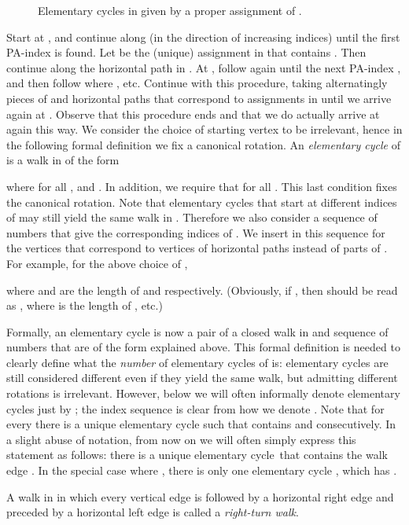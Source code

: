 \documentclass{llncs}
\def\term#1{{\em #1}\marginpar{\raggedright{\small\it #1}}}
\newcommand{\elcyc}{elementary cycle}
\begin{document}
\begin{figure}
\centering
\scalebox{0.75}{WAW,A}
\caption{Elementary cycles in  given by a proper assignment  of .}
\label{fig:elcycs}
\end{figure} 
 
 
Start at , and continue along  (in the direction of increasing indices) until the first PA-index  is found. Let  be the (unique) assignment in  that contains . Then continue along the horizontal path  in . At , follow  again until the next PA-index , and then follow  where , etc. Continue with this procedure, taking alternatingly pieces of  and horizontal paths that correspond to assignments in  until we arrive again at . 
Observe that this procedure ends and that we do actually arrive at  again this way. We consider the choice of starting vertex to be irrelevant, hence in the following formal definition we fix a canonical rotation.
An \term{elementary cycle} of  is a walk in  of the form

where  for all , and . In addition, we require that  for all . This last condition fixes the canonical rotation. 
Note that elementary cycles that start at different indices of  may still yield the same walk in .
Therefore we also consider a sequence  of numbers that give the corresponding indices of . We insert  in this sequence for the vertices that correspond to vertices of horizontal paths instead of parts of . For example, for the above choice of ,

where  and  are the length of  and  respectively. 
 (Obviously, if , then  should be read as , where  is the length of , etc.)

Formally, an elementary cycle is now a pair  of a closed walk  in  and sequence of numbers  that are of the form explained above. 
This formal definition is needed to clearly define what the {\em number} of elementary cycles of  is: elementary cycles are still considered different even if they yield the same walk, but admitting different rotations is irrelevant.
However, below we will often informally denote elementary cycles just by ; the index sequence  is clear from how we denote . 
Note that for every  there is a unique elementary cycle  such that  contains  and  consecutively. In a slight abuse of notation, from now on we will often simply express this statement as follows: there is a unique \elcyc\  that contains the walk edge .
In the special case where , there is only one elementary cycle , which has .


\medskip

A walk in  in which every vertical edge is followed by a horizontal right edge and preceded by a horizontal left edge is called a \term{right-turn walk}.
\end{document}
